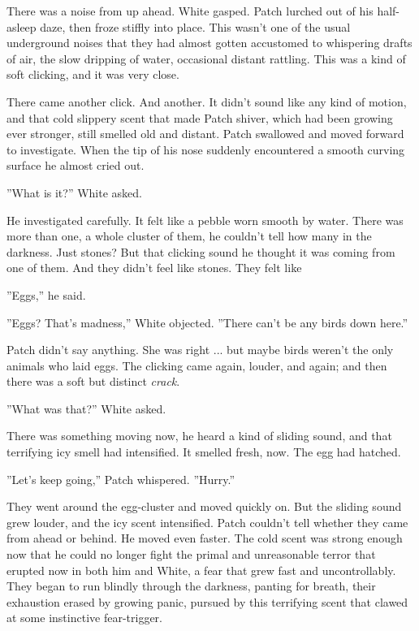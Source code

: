 \documentclass[12pt]{book}
\begin{document}
 There was a noise from up ahead. White gasped. Patch lurched out of his half-asleep daze, then froze stiffly into place. This wasn't one of the usual underground noises that they had almost gotten accustomed to %
 whispering drafts of air, the slow dripping of water, occasional distant rattling. This was a kind of soft clicking, and it was very close. \par
 There came another click. And another. It didn't sound like any kind of motion, and that cold slippery scent that made Patch shiver, which had been growing ever stronger, still smelled old and distant. Patch swallowed and moved forward to investigate. When the tip of his nose suddenly encountered a smooth curving surface he almost cried out.\par
 ''What is it?'' White asked.\par
 He investigated carefully. It felt like a pebble worn smooth by water. There was more than one, a whole cluster of them, he couldn't tell how many in the darkness. Just stones? But that clicking sound %
 he thought it was coming from one of them. And they didn't feel like stones. They felt like %
\par
 ''Eggs,'' he said.\par
 ''Eggs? That's madness,'' White objected. ''There can't be any birds down here.''\par
 Patch didn't say anything. She was right ... but maybe birds weren't the only animals who laid eggs. The clicking came again, louder, and again; and then there was a soft but distinct {\it crack}.\par
 ''What was that?'' White asked.\par
 There was something moving now, he heard a kind of sliding sound, and that terrifying icy smell had intensified. It smelled fresh, now. The egg had hatched.\par
 ''Let's keep going,'' Patch whispered. ''Hurry.''\par
 They went around the egg-cluster and moved quickly on. But the sliding sound grew louder, and the icy scent intensified. Patch couldn't tell whether they came from ahead or behind. He moved even faster. The cold scent was strong enough now that he could no longer fight the primal and unreasonable terror that erupted now in both him and White, a fear that grew fast and uncontrollably. They began to run blindly through the darkness, panting for breath, their exhaustion erased by growing panic, pursued by this terrifying scent that clawed at some instinctive fear-trigger.\par
\end{document}

